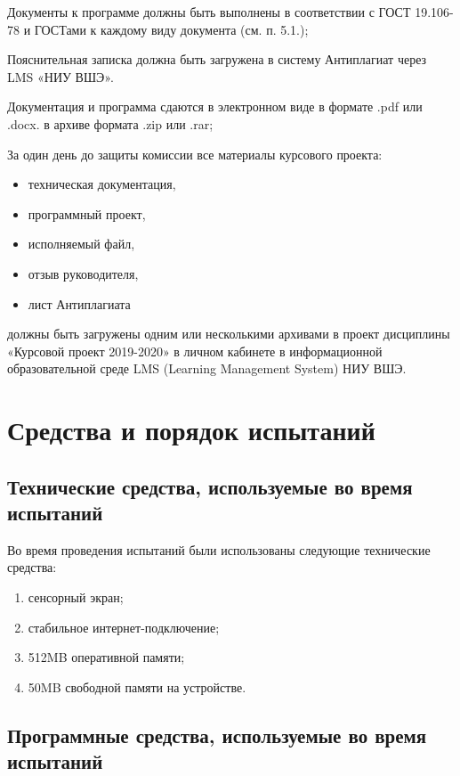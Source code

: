 \documentclass{../includes/TechDoc}
\begin{document}
    Документы к программе должны быть выполнены в соответствии с ГОСТ 19.106-78 и ГОСТами к каждому виду документа (см. п. 5.1.);

    Пояснительная записка должна быть загружена в систему Антиплагиат через LMS «НИУ ВШЭ».

    Документация и программа сдаются в электронном виде в формате .pdf или .docx. в архиве формата .zip или .rar;

    За один день до защиты комиссии все материалы курсового проекта:
    \begin{itemize}
        \item техническая документация,
        \item программный проект,
        \item исполняемый файл,
        \item отзыв руководителя,
        \item лист Антиплагиата
    \end{itemize}
    должны быть загружены одним или несколькими архивами в проект дисциплины «Курсовой проект 2019-2020» в личном кабинете в информационной образовательной среде LMS (Learning Management System) НИУ ВШЭ.


    \section{Средства и порядок испытаний}

    \subsection{Технические средства, используемые во время испытаний}

    Во время проведения испытаний были использованы следующие технические средства:
    \begin{enumerate}
        \item сенсорный экран;
        \item стабильное интернет-подключение;
        \item 512MB оперативной памяти;
        \item 50MB свободной памяти на устройстве.
    \end{enumerate}

    \subsection{Программные средства, используемые во время испытаний}
\end{document}

